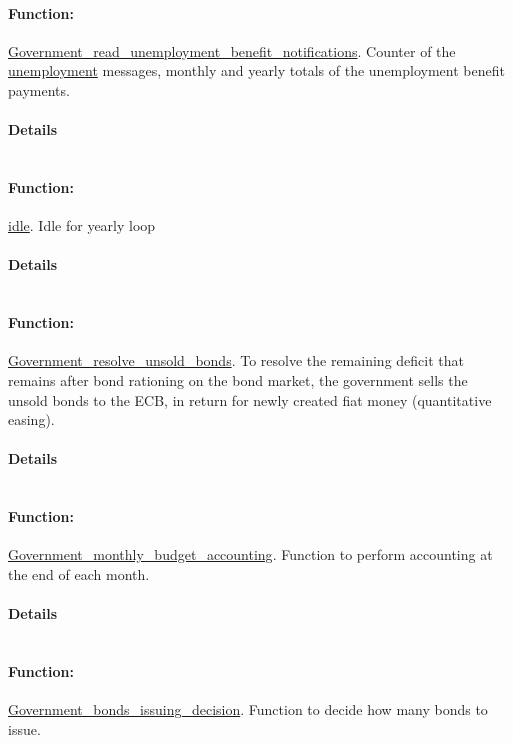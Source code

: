 \documentclass[a4paper,11pt]{article}
\begin{document}
\paragraph{Function:}\url{Government_read_unemployment_benefit_notifications}.
Counter of the \url{unemployment} messages, monthly and yearly totals of the unemployment benefit payments.
\paragraph{Details}
\begin{verbatim}
\end{verbatim}
\paragraph{Function:}\url{idle}.
Idle for yearly loop
\paragraph{Details}
\begin{verbatim}
\end{verbatim}
\paragraph{Function:}\url{Government_resolve_unsold_bonds}.
To resolve the remaining deficit that remains after bond rationing on the bond market, the government sells the unsold bonds to the ECB, in return for newly created fiat money (quantitative easing).
\paragraph{Details}
\begin{verbatim}
\end{verbatim}
\paragraph{Function:}\url{Government_monthly_budget_accounting}.
Function to perform accounting at the end of each month.
\paragraph{Details}
\begin{verbatim}
\end{verbatim}
\paragraph{Function:}\url{Government_bonds_issuing_decision}.
Function to decide how many bonds to issue.
\end{document}
